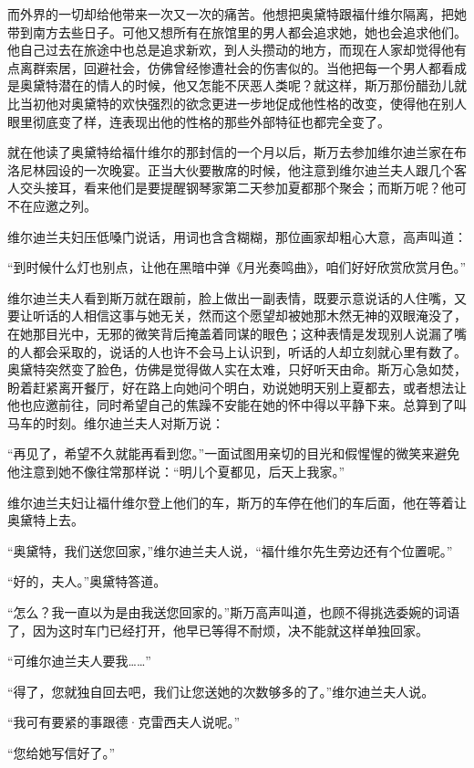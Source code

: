 \par 而外界的一切却给他带来一次又一次的痛苦。他想把奥黛特跟福什维尔隔离，把她带到南方去些日子。可他又想所有在旅馆里的男人都会追求她，她也会追求他们。他自己过去在旅途中也总是追求新欢，到人头攒动的地方，而现在人家却觉得他有点离群索居，回避社会，仿佛曾经惨遭社会的伤害似的。当他把每一个男人都看成是奥黛特潜在的情人的时候，他又怎能不厌恶人类呢？就这样，斯万那份醋劲儿就比当初他对奥黛特的欢快强烈的欲念更进一步地促成他性格的改变，使得他在别人眼里彻底变了样，连表现出他的性格的那些外部特征也都完全变了。
\par 就在他读了奥黛特给福什维尔的那封信的一个月以后，斯万去参加维尔迪兰家在布洛尼林园设的一次晚宴。正当大伙要散席的时候，他注意到维尔迪兰夫人跟几个客人交头接耳，看来他们是要提醒钢琴家第二天参加夏都那个聚会；而斯万呢？他可不在应邀之列。
\par 维尔迪兰夫妇压低嗓门说话，用词也含含糊糊，那位画家却粗心大意，高声叫道：
\par “到时候什么灯也别点，让他在黑暗中弹《月光奏鸣曲》，咱们好好欣赏欣赏月色。”
\par 维尔迪兰夫人看到斯万就在跟前，脸上做出一副表情，既要示意说话的人住嘴，又要让听话的人相信这事与她无关，然而这个愿望却被她那木然无神的双眼淹没了，在她那目光中，无邪的微笑背后掩盖着同谋的眼色；这种表情是发现别人说漏了嘴的人都会采取的，说话的人也许不会马上认识到，听话的人却立刻就心里有数了。奥黛特突然变了脸色，仿佛是觉得做人实在太难，只好听天由命。斯万心急如焚，盼着赶紧离开餐厅，好在路上向她问个明白，劝说她明天别上夏都去，或者想法让他也应邀前往，同时希望自己的焦躁不安能在她的怀中得以平静下来。总算到了叫马车的时刻。维尔迪兰夫人对斯万说：
\par “再见了，希望不久就能再看到您。”一面试图用亲切的目光和假惺惺的微笑来避免他注意到她不像往常那样说：“明儿个夏都见，后天上我家。”
\par 维尔迪兰夫妇让福什维尔登上他们的车，斯万的车停在他们的车后面，他在等着让奥黛特上去。
\par “奥黛特，我们送您回家，”维尔迪兰夫人说，“福什维尔先生旁边还有个位置呢。”
\par “好的，夫人。”奥黛特答道。
\par “怎么？我一直以为是由我送您回家的。”斯万高声叫道，也顾不得挑选委婉的词语了，因为这时车门已经打开，他早已等得不耐烦，决不能就这样单独回家。
\par “可维尔迪兰夫人要我……”
\par “得了，您就独自回去吧，我们让您送她的次数够多的了。”维尔迪兰夫人说。
\par “我可有要紧的事跟德·克雷西夫人说呢。”
\par “您给她写信好了。”
